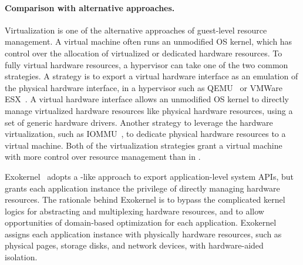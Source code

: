 \paragraph{Comparison with alternative approaches.}
Virtualization is one of the alternative approaches of guest-level resource management. %
A virtual machine often runs an unmodified OS kernel,
which has control over the allocation of virtualized or dedicated hardware resources.
To fully virtual hardware resources,
a hypervisor can take one of the two common strategies.
A strategy
is to export a virtual hardware interface
as an emulation of the physical hardware interface,
in a hypervisor
such as QEMU~\cite{qemu} or VMWare ESX~\cite{wldspurger02vmware-esx}.
A virtual hardware interface
allows an unmodified OS kernel to
directly manage virtualized hardware resources like physical hardware resources,
using a set of generic hardware drivers.
Another strategy to leverage the hardware virtualization,
such as IOMMU~\cite{VT-d},
to dedicate physical hardware resources
to a virtual machine.
Both of the virtualization strategies grant a virtual machine with more control over resource management %
than \thelibos{} in \graphene{}.




Exokernel~\cite{engler95exokernel} adopts a \libos{}-like approach
to export application-level system APIs, but grants each application instance the privilege of directly managing hardware resources. 
The rationale behind Exokernel is to bypass the complicated kernel logics
for abstracting and multiplexing hardware resources,
and to allow opportunities of domain-based optimization for each application.
Exokernel assigns each application instance
with physically hardware resources, such as physical pages, storage disks, and network devices, with hardware-aided isolation.~





















